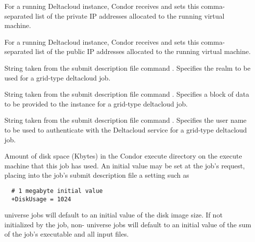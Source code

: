 \begin{description}
\item[\AdAttr{DeltacloudPrivateNetworkAddresses}:] 
For a running Deltacloud instance,
Condor receives and sets this comma-separated list of the private IP addresses
allocated to the running virtual machine.

\item[\AdAttr{DeltacloudPublicNetworkAddresses}:] 
For a running Deltacloud instance,
Condor receives and sets this comma-separated list of the public IP addresses
allocated to the running virtual machine.

\item[\AdAttr{DeltacloudRealmId}:] 
String taken from the submit description file command
.
Specifies the realm to be used for a grid-type deltacloud job.

\item[\AdAttr{DeltacloudUserData}:] 
String taken from the submit description file command
.
Specifies a block of data to be provided to the instance
for a grid-type deltacloud job.

\item[\AdAttr{DeltacloudUsername}:] 
String taken from the submit description file command
.
Specifies the user name to be used to authenticate
with the Deltacloud service for a grid-type deltacloud job.

\item[\AdAttr{DiskUsage}:] Amount of disk space (Kbytes) in the Condor
execute directory on the execute machine that this job has used.
An initial value may be set at the job's request, placing into the
job's submit description file a setting such as
\begin{verbatim}
  # 1 megabyte initial value
  +DiskUsage = 1024
\end{verbatim}
 universe jobs will default to an initial value of the disk
image size. 
If not initialized by the job,
non- universe jobs will default to an initial value of the 
sum of the job's executable and all input files.


\end{description}
